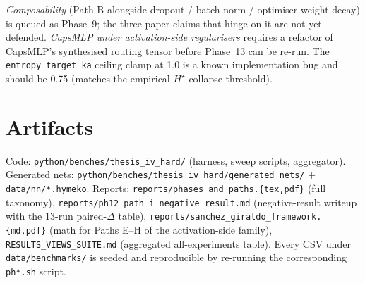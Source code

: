 \documentclass[11pt,a4paper]{article}
\begin{document}
\textit{Composability} (Path B alongside dropout / batch-norm /
optimiser weight decay) is queued as Phase~9; the three paper
claims that hinge on it are not yet defended. \textit{CapsMLP under
activation-side regularisers} requires a refactor of CapsMLP's
synthesised routing tensor before Phase~13 can be re-run. The
\texttt{entropy\_target\_ka} ceiling clamp at 1.0 is a known
implementation bug and should be 0.75 (matches the empirical
$H^\star$ collapse threshold).

\section*{Artifacts}

Code: \texttt{python/benches/thesis\_iv\_hard/} (harness, sweep
scripts, aggregator). Generated nets:
\texttt{python/benches/thesis\_iv\_hard/generated\_nets/} +
\texttt{data/nn/*.hymeko}. Reports:
\texttt{reports/phases\_and\_paths.\{tex,pdf\}} (full taxonomy),
\texttt{reports/ph12\_path\_i\_negative\_result.md} (negative-result
writeup with the 13-run paired-$\Delta$ table),
\texttt{reports/sanchez\_giraldo\_framework.\{md,pdf\}} (math for
Paths E--H of the activation-side family),
\texttt{RESULTS\_VIEWS\_SUITE.md} (aggregated all-experiments
table). Every CSV under \texttt{data/benchmarks/} is seeded and
reproducible by re-running the corresponding \texttt{ph*.sh}
script.
\end{document}
